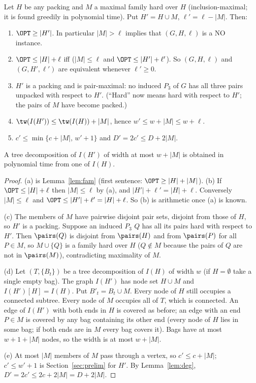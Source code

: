 \begin{lemma}\label{lem:MAX}
Let $H$ be any packing and $M$ a maximal family hard over $H$ (inclusion-maximal; it is found greedily in polynomial time). Put $H'=H\cup M$, $\ell'=\ell-|M|$. Then:
\begin{enumerate}
\item[(a)] $\OPT\ge|H'|$. In particular $|M|>\ell$ implies that $(G,H,\ell)$ is a NO instance.
\item[(b)] $\OPT\le|H|+\ell$ iff ($|M|\le\ell$ and $\OPT\le|H'|+\ell'$). So $(G,H,\ell)$ and $(G,H',\ell')$ are equivalent whenever $\ell'\ge0$.
\item[(c)] $H'$ is a packing and is pair-maximal: no induced $P_3$ of $G$ has all three pairs unpacked with respect to $H'$. (``Hard'' now means hard with respect to $H'$; the pairs of $M$ have become packed.)
\item[(d)] $\tw(I(H'))\le\tw(I(H))+|M|$, hence $w'\le w+|M|\le w+\ell$.
\item[(e)] $c'\le\min\{c+|M|,\,w'+1\}$ and $D'=2c'\le D+2|M|$.
\end{enumerate}
A tree decomposition of $I(H')$ of width at most $w+|M|$ is obtained in polynomial time from one of $I(H)$.
\end{lemma}
\begin{proof}
(a) is Lemma~\ref{lem:fam} (first sentence: $\OPT\ge|H|+|M|$). (b) If $\OPT\le|H|+\ell$ then $|M|\le\ell$ by (a), and $|H'|+\ell'=|H|+\ell$. Conversely $|M|\le\ell$ and $\OPT\le|H'|+\ell'=|H|+\ell$. So (b) is arithmetic once (a) is known.

(c) The members of $M$ have pairwise disjoint pair sets, disjoint from those of $H$, so $H'$ is a packing. Suppose an induced $P_3$ $Q$ has all its pairs hard with respect to $H'$. Then $\pairs(Q)$ is disjoint from $\pairs(H)$ and from $\pairs(P)$ for all $P\in M$, so $M\cup\{Q\}$ is a family hard over $H$ ($Q\notin M$ because the pairs of $Q$ are not in $\pairs(M)$), contradicting maximality of $M$.

(d) Let $(T,\{B_t\})$ be a tree decomposition of $I(H)$ of width $w$ (if $H=\emptyset$ take a single empty bag). The graph $I(H')$ has node set $H\cup M$ and $I(H')[H]=I(H)$. Put $B'_t=B_t\cup M$. Every node of $H$ still occupies a connected subtree. Every node of $M$ occupies all of $T$, which is connected. An edge of $I(H')$ with both ends in $H$ is covered as before; an edge with an end $P\in M$ is covered by any bag containing its other end (every node of $H$ lies in some bag; if both ends are in $M$ every bag covers it). Bags have at most $w+1+|M|$ nodes, so the width is at most $w+|M|$.

(e) At most $|M|$ members of $M$ pass through a vertex, so $c'\le c+|M|$; $c'\le w'+1$ is Section~\ref{sec:prelim} for $H'$. By Lemma~\ref{lem:deg}, $D'=2c'\le 2c+2|M|=D+2|M|$.
\end{proof}
